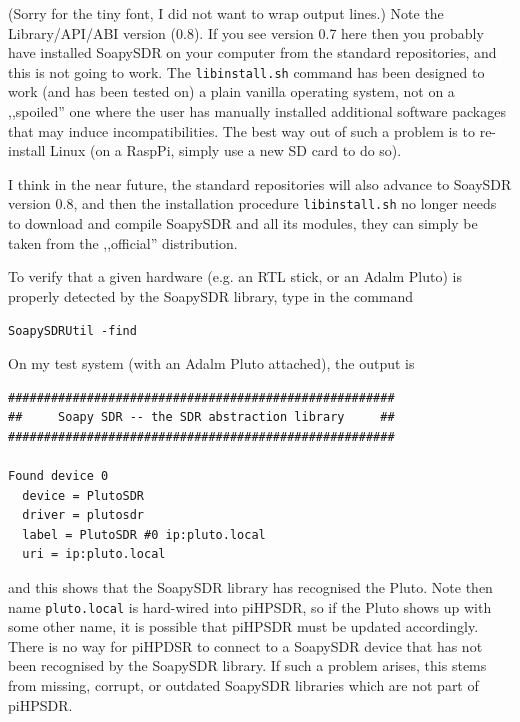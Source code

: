 \documentclass[12pt]{book}
\def\grtt#1{\texttt{\color{magenta}#1}}
\def\pH{pi\-HPSDR\xspace}
\begin{document}
(Sorry for the tiny font, I did not want to wrap output lines.)
Note the Library/API/ABI version (0.8). If you see version 0.7 here
then you probably have installed SoapySDR on your computer
from
the standard repositories, and this is not going to work. The \texttt{libinstall.sh} command  has been
designed
to work (and has been tested on) a plain vanilla operating system, not on a ,,spoiled'' one
where the user has manually installed additional software packages that may induce incompatibilities.
The best way out of such a problem is to re-install Linux (on a RaspPi, simply use a new SD card to do so).

I think in the near future, the standard repositories will also advance to SoaySDR version 0.8, and then
the installation procedure \texttt{libinstall.sh} no longer needs to download and compile SoapySDR and all
its modules, they can simply be taken from the ,,official'' distribution.

\clearpage
To verify that a given hardware (e.g. an RTL stick, or an Adalm Pluto) is properly detected by the
SoapySDR library, type in the command

\grtt{SoapySDRUtil -find}

On my test system (with an Adalm Pluto attached), the output is

\begin{small}
\begin{verbatim}
######################################################
##     Soapy SDR -- the SDR abstraction library     ##
######################################################

Found device 0
  device = PlutoSDR
  driver = plutosdr
  label = PlutoSDR #0 ip:pluto.local
  uri = ip:pluto.local
\end{verbatim}
\end{small}

and this shows that the SoapySDR library has recognised the Pluto. Note then name \texttt{pluto.local}
is hard-wired into \pH, so if the Pluto shows up with some other name, it is possible that
\pH must be updated accordingly. There is no way for piHPDSR to connect
to a SoapySDR device that has not been recognised by the SoapySDR library. If such a problem arises, this
stems from missing, corrupt, or outdated SoapySDR libraries which are not part of \pH.

\end{document}
